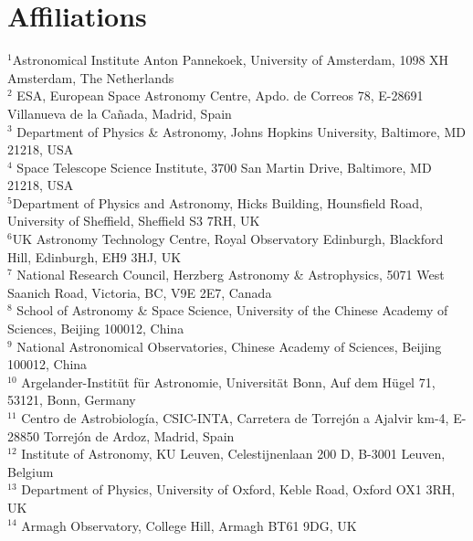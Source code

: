 \documentclass[apjl,twocolumn]{emulateapj}
\begin{document}
\section*{Affiliations}
\noindent $^{1}${Astronomical Institute Anton Pannekoek, University of
    Amsterdam, 1098 XH Amsterdam, The Netherlands} \\
  $^{2}$ {ESA, European Space Astronomy Centre, Apdo. de Correos 78,
    E-28691 Villanueva de la Ca\~nada, Madrid, Spain} \\
 $^{3}$ {
 Department of Physics \& Astronomy, Johns Hopkins University, Baltimore, MD 21218, USA}\\
  $^{4}$ {Space Telescope Science Institute, 3700 San Martin Drive,
    Baltimore, MD 21218, USA}\\
  $^{5}${Department of Physics and Astronomy, Hicks Building,
    Hounsfield Road, University of Sheffield, Sheffield S3 7RH, UK}\\
  $^{6}${UK Astronomy Technology Centre, Royal Observatory Edinburgh, Blackford Hill, Edinburgh, EH9 3HJ, UK}\\
  $^{7}$ {National Research Council, Herzberg Astronomy \&
    Astrophysics, 5071 West Saanich Road, Victoria, BC, V9E 2E7,
    Canada}\\
  $^{8}$ {School of Astronomy \& Space Science, University of the Chinese
    Academy of Sciences, Beijing 100012, China}\\
  $^{9}$ {National Astronomical Observatories, Chinese Academy of
    Sciences, Beijing 100012, China}\\
  $^{10}$ {Argelander-Instit\"ut f\"ur Astronomie, Universit\"at Bonn,
    Auf dem H\"ugel 71, 53121, Bonn, Germany}\\
  $^{11}$ {Centro de Astrobiología, CSIC-INTA, Carretera de Torrejón a Ajalvir km-4, E-28850 Torrejón de Ardoz, Madrid, Spain}\\
  $^{12}$ {Institute of Astronomy, KU Leuven, Celestijnenlaan 200 D, B-3001 Leuven, Belgium}\\
  $^{13}$ {Department of Physics, University of Oxford, Keble Road,
    Oxford OX1 3RH, UK} \\
  $^{14}$ {Armagh Observatory, College Hill, Armagh BT61 9DG, UK}\\

  
\end{document}
